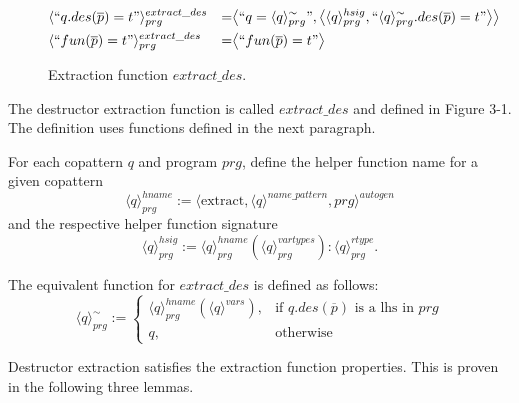 \begin{figure}
\vspace{2.4in}
\begin{alignat*}{3}
& \langle `` q.des(\overline{p}) = t " \rangle^{extract\_des}_{prg} &= &\big\langle `` q =  \langle q \rangle^{\sim}_{prg} ", \big\langle \langle q \rangle^{hsig}_{prg}, `` \langle q \rangle^{\sim}_{prg}.des(\overline{p}) = t  " \big\rangle \big\rangle \span\span \\
& \langle `` fun(\overline{p}) = t " \rangle^{extract\_des}_{prg} &= &\big\langle `` fun(\overline{p}) = t " \big\rangle \span\span
\end{alignat*}
\caption{Extraction function $extract\_des$.}
\end{figure}

The destructor extraction function is called $extract\_des$ and defined in Figure 3-1. The definition uses functions defined in the next paragraph.

For each copattern $q$ and program $prg$, define the helper function name for a given copattern
\begin{equation*}
\langle q \rangle^{hname}_{prg} := \langle \textrm{extract}, \langle q \rangle^{name\_pattern}, prg \rangle^{autogen}
\end{equation*}
and the respective helper function signature
\begin{equation*}
\langle q \rangle^{hsig}_{prg} := \langle q \rangle^{hname}_{prg}(\langle q \rangle^{vartypes}_{prg}): \langle q \rangle^{rtype}_{prg}.
\end{equation*}

The equivalent function for $extract\_des$ is defined as follows:
\[
    \langle q \rangle^{\sim}_{prg} :=
\begin{cases}
    \langle q \rangle^{hname}_{prg}(\langle q \rangle^{vars}),& \text{if $q.des(\overline{p})$ is a lhs in $prg$} \\
    q,                                                                                      & \text{otherwise}
\end{cases}
\]

Destructor extraction satisfies the extraction function properties. This is proven in the following three lemmas.

